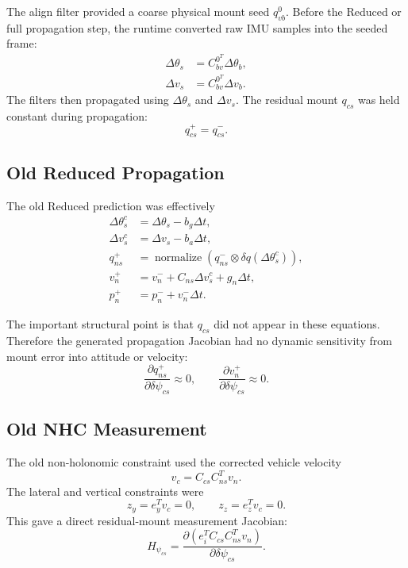 \documentclass[11pt]{article}
\newcommand{\T}{^{T}}
\newcommand{\dt}{\Delta t}
\newcommand{\dq}{\delta q}
\begin{document}
The align filter provided a coarse physical mount seed \(q_{vb}^{0}\). Before
the Reduced or full propagation step, the runtime converted raw IMU samples into
the seeded frame:
\begin{align}
  \Delta\theta_s &= C_{bv}^{0\T}\Delta\theta_b,\\
  \Delta v_s &= C_{bv}^{0\T}\Delta v_b.
\end{align}
The filters then propagated using \(\Delta\theta_s\) and \(\Delta v_s\). The
residual mount \(q_{cs}\) was held constant during propagation:
\begin{equation}
  q_{cs}^{+}=q_{cs}^{-}.
\end{equation}

\subsection{Old Reduced Propagation}

The old Reduced prediction was effectively
\begin{align}
  \Delta\theta_s^c &= \Delta\theta_s - b_g\dt,\\
  \Delta v_s^c &= \Delta v_s - b_a\dt,\\
  q_{ns}^{+} &= \operatorname{normalize}
    \left(q_{ns}^{-}\otimes\dq(\Delta\theta_s^c)\right),\\
  v_n^{+} &= v_n^{-}+C_{ns}\Delta v_s^c+g_n\dt,\\
  p_n^{+} &= p_n^{-}+v_n^{-}\dt.
\end{align}

The important structural point is that \(q_{cs}\) did not appear in these
equations. Therefore the generated propagation Jacobian had no dynamic
sensitivity from mount error into attitude or velocity:
\begin{equation}
  \frac{\partial q_{ns}^{+}}{\partial \delta\psi_{cs}} \approx 0,
  \qquad
  \frac{\partial v_n^{+}}{\partial \delta\psi_{cs}} \approx 0.
\end{equation}

\subsection{Old NHC Measurement}

The old non-holonomic constraint used the corrected vehicle velocity
\begin{equation}
  v_c = C_{cs}C_{ns}\T v_n .
\end{equation}
The lateral and vertical constraints were
\begin{equation}
  z_y = e_y\T v_c = 0,\qquad z_z = e_z\T v_c = 0.
\end{equation}
This gave a direct residual-mount measurement Jacobian:
\begin{equation}
  H_{\psi_{cs}} =
  \frac{\partial(e_i\T C_{cs}C_{ns}\T v_n)}
       {\partial \delta\psi_{cs}}.
\end{equation}
\end{document}

